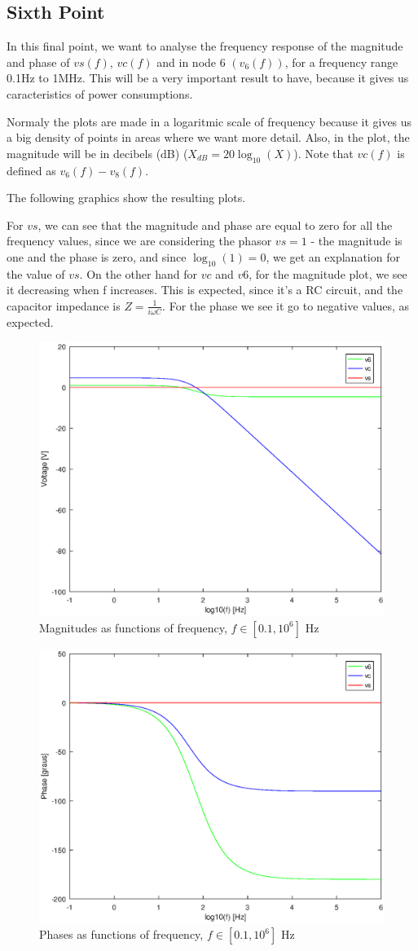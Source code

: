 \subsection{Sixth Point}
\label{ssec:6T}

\par In this final point, we want to analyse the frequency response of the magnitude and phase of $vs(f)$, $vc(f)$ and in node 6 $(v_6(f))$, for a frequency range 0.1Hz to 1MHz. This will be a very important result to have, because it gives us caracteristics of power consumptions.
\par Normaly the plots are made in a logaritmic scale of frequency because it gives us a big density of points in areas where we want more detail. Also, in the plot, the magnitude will be in decibels (dB) ($X_{dB}=20\log _{10}(X)$). Note that $vc(f)$ is defined as $v_6(f)-v_8(f)$.
\par The following graphics show the resulting plots.
\par For $vs$, we can see that the magnitude and phase are equal to zero for all the frequency values, since we are considering the phasor $vs=1$ - the magnitude is one and the phase is zero, and since $\log _{10}(1)=0$, we get an explanation for the value of $vs$. On the other hand for $vc$ and $v6$, for the magnitude plot, we see it decreasing when f increases. This is expected, since it's a RC circuit, and the capacitor impedance is $Z=\frac{1}{i \omega C}$. For the phase we see it go to negative values, as expected. 

\begin{figure}[h!] \centering
\includegraphics[width=0.6\linewidth]{magnitude(freq).eps}
\caption{Magnitudes as functions of frequency, $f\in[0.1,10^6]$ Hz}
\label{fig:mag(f)}
\end{figure}

\begin{figure}[h!] \centering
\includegraphics[width=0.6\linewidth]{phase(freq).eps}
\caption{Phases as functions of frequency, $f\in[0.1,10^6]$ Hz}
\label{fig:pha(f)}
\end{figure}
\newpage

